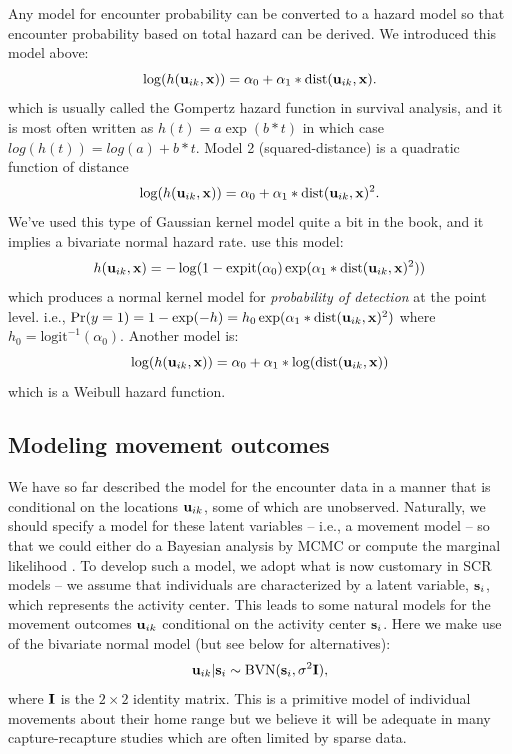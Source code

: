 Any model for encounter probability can be converted to a hazard model
so that encounter probability based on total hazard can be derived.
We introduced this model above:
\[
\log(h({\bf u}_{ik},{\bf x})) = \alpha_{0} + \alpha_{1}*\mbox{dist}({\bf u}_{ik},{\bf x}).
\]
which is usually called the Gompertz hazard function in survival
analysis, and it is most often written as $h(t) = a \exp( b*t)$ in which
case $log(h(t)) = log(a) + b*t$.  
Model 2 (squared-distance) is a
quadratic function of distance
\[
\log(h({\bf u}_{ik},{\bf x})) = \alpha_{0} + \alpha_{1}*\mbox{dist}({\bf u}_{ik},{\bf x})^2.
\]
We've used this type of Gaussian kernel model 
quite a bit in the book, and it implies a
bivariate normal hazard rate. \citet{borchers_efford:2008} use this model:
\[
h({\bf u}_{ik},{\bf x} ) = -\log(1 - \mbox{expit}(\alpha_{0})
\exp( \alpha_{1}*\mbox{dist}({\bf u}_{ik},{\bf x})^2 ) )
\]
which produces a normal kernel model for {\it probability of
  detection} at the point level. i.e., $\Pr(y=1) = 1-\exp(-h) = h_{0}
\exp( \alpha_{1}*\mbox{dist}({\bf u}_{ik},{\bf x})^2 )$ where $h_{0} =
\mbox{logit}^{-1}(\alpha_{0})$.  
Another model is:
\[
\log(h({\bf u}_{ik},{\bf x})) = \alpha_{0} + \alpha_{1}*\log(\mbox{dist}({\bf u}_{ik},{\bf x}))
\]
which is a Weibull hazard function.



\subsection{Modeling movement outcomes}

We have so far described the model for the encounter data in a manner
that is conditional on the locations ${\bf u}_{ik}$, some of which are
unobserved. Naturally, we should specify a model for these latent
variables -- i.e., a movement model -- so that we could either do a
Bayesian analysis by MCMC \citep{royle_young:2008, royle_etal:2011} or
compute the marginal likelihood \citep{efford:2011}.  To develop such
a model, we adopt what is now customary in SCR models -- we assume
that individuals are characterized by a latent variable, ${\bf
  s}_{i}$, which represents the activity center.  This leads to some
natural models for the movement outcomes ${\bf u}_{ik}$ conditional on
the activity center ${\bf s}_{i}$. Here we make use of the bivariate
normal model (but see below for alternatives):
\[
 {\bf u}_{ik} | {\bf s}_{i} \sim \mbox{BVN}({\bf s}_{i}, \sigma^{2}{\bf I}),
\]
where ${\bf I}$ is the $2\times 2$ identity matrix.  
This is a primitive model of individual movements about their home
range but we believe it will be adequate in many capture-recapture
studies which are often limited by sparse data.

